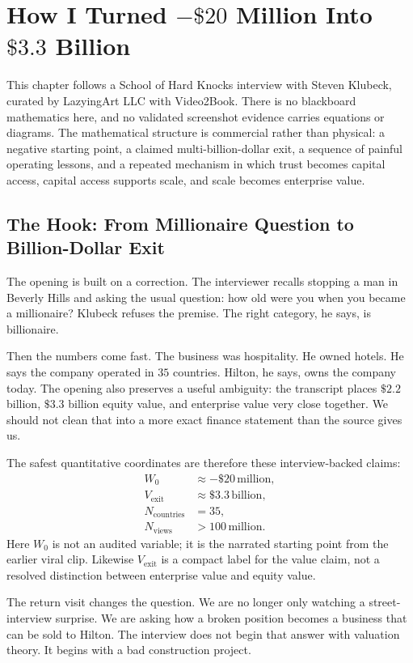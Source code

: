 \chapter{How I Turned \(-\$20\) Million Into \(\$3.3\) Billion}

This chapter follows a School of Hard Knocks interview with Steven Klubeck, curated by LazyingArt LLC with Video2Book. There is no blackboard mathematics here, and no validated screenshot evidence carries equations or diagrams. The mathematical structure is commercial rather than physical: a negative starting point, a claimed multi-billion-dollar exit, a sequence of painful operating lessons, and a repeated mechanism in which trust becomes capital access, capital access supports scale, and scale becomes enterprise value.

\section{The Hook: From Millionaire Question to Billion-Dollar Exit}

The opening is built on a correction. The interviewer recalls stopping a man in Beverly Hills and asking the usual question: how old were you when you became a millionaire? Klubeck refuses the premise. The right category, he says, is billionaire.

Then the numbers come fast. The business was hospitality. He owned hotels. He says the company operated in \(35\) countries. Hilton, he says, owns the company today. The opening also preserves a useful ambiguity: the transcript places \(\$2.2\) billion, \(\$3.3\) billion equity value, and enterprise value very close together. We should not clean that into a more exact finance statement than the source gives us.

The safest quantitative coordinates are therefore these interview-backed claims:
\begin{align}
W_0 &\approx -\$20\,\text{million},\\
V_{\text{exit}} &\approx \$3.3\,\text{billion},\\
N_{\text{countries}} &= 35,\\
N_{\text{views}} &> 100\,\text{million}.
\end{align}
Here \(W_0\) is not an audited variable; it is the narrated starting point from the earlier viral clip. Likewise \(V_{\text{exit}}\) is a compact label for the value claim, not a resolved distinction between enterprise value and equity value.

The return visit changes the question. We are no longer only watching a street-interview surprise. We are asking how a broken position becomes a business that can be sold to Hilton. The interview does not begin that answer with valuation theory. It begins with a bad construction project.

